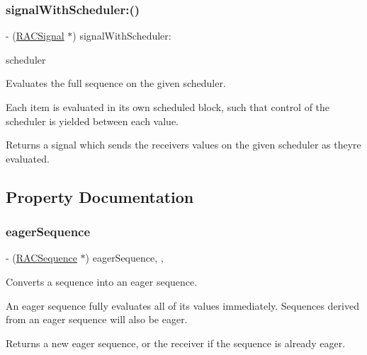 \subsubsection{\texorpdfstring{signal\+With\+Scheduler\+:()}{signalWithScheduler:()}\hspace{0.1cm}{\footnotesize\ttfamily [3/3]}}
{\footnotesize\ttfamily -\/ (\mbox{\hyperlink{interface_r_a_c_signal}{R\+A\+C\+Signal}} $\ast$) signal\+With\+Scheduler\+: \begin{DoxyParamCaption}\item[{(\mbox{\hyperlink{interface_r_a_c_scheduler}{R\+A\+C\+Scheduler}} $\ast$)}]{scheduler }\end{DoxyParamCaption}}

Evaluates the full sequence on the given scheduler.

Each item is evaluated in its own scheduled block, such that control of the scheduler is yielded between each value.

Returns a signal which sends the receiver\textquotesingle{}s values on the given scheduler as they\textquotesingle{}re evaluated. 

\subsection{Property Documentation}
\mbox{\label{interface_r_a_c_sequence_a7a634c1999dd8289829a044e192ccf8e}} 
\subsubsection{\texorpdfstring{eager\+Sequence}{eagerSequence}}
{\footnotesize\ttfamily -\/ (\mbox{\hyperlink{interface_r_a_c_sequence}{R\+A\+C\+Sequence}} $\ast$) eager\+Sequence\hspace{0.3cm}{\ttfamily [read]}, {\ttfamily [nonatomic]}, {\ttfamily [copy]}}

Converts a sequence into an eager sequence.

An eager sequence fully evaluates all of its values immediately. Sequences derived from an eager sequence will also be eager.

Returns a new eager sequence, or the receiver if the sequence is already eager. \mbox{\label{interface_r_a_c_sequence_aefb922e4c06f38650b679f62c280f726}} 
